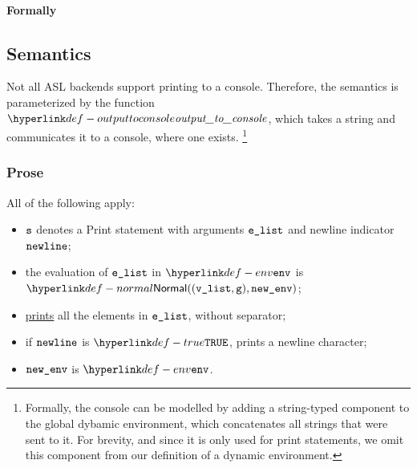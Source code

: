 \paragraph{Formally}
\begin{mathpar}
\end{mathpar}

\subsection{Semantics}

Not all ASL backends support printing to a console.
%
Therefore, the semantics is parameterized by the function $\outputtoconsole$,
which takes a string and communicates it to a console, where one exists.%
\footnote{%
  Formally, the console can be modelled by adding a string-typed component to
  the global dybamic environment, which concatenates all strings that were sent
  to it. For brevity, and since it is only used for print statements, we omit
  this component from our definition of a dynamic environment.%
}

\subsubsection{Prose}
All of the following apply:
\begin{itemize}
  \item $\vs$ denotes a Print statement with arguments $\elist$ and newline indicator $\vnewline$;
  \item the evaluation of $\elist$ in $\env$ is $\Normal((\vlist, \vg), \newenv)$\ProseOrAbnormal;
  \item \hyperlink{def-outputtoconsole}{prints} all the elements in $\elist$, without separator;
  \item if $\vnewline$ is $\True$, prints a newline character;
  \item $\newenv$ is $\env$.
\end{itemize}

